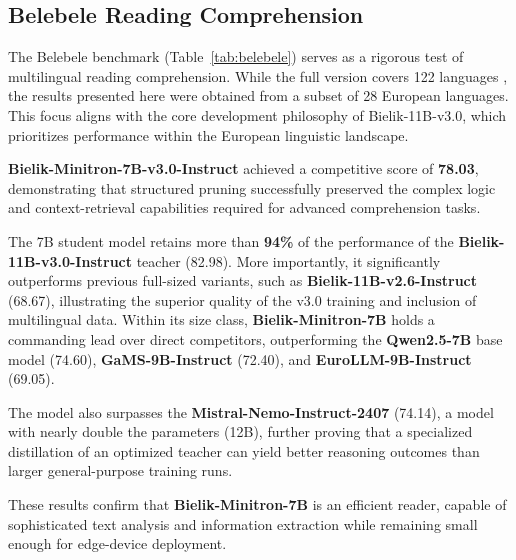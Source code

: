 \documentclass{article}
\begin{document}
\subsection{Belebele Reading Comprehension}
The Belebele benchmark (Table~\ref{tab:belebele}) serves as a rigorous test of multilingual reading comprehension. While the full version covers 122 languages \cite{Bandarkar_2024}, the results presented here were obtained from a subset of 28 European languages. This focus aligns with the core development philosophy of Bielik-11B-v3.0, which prioritizes performance within the European linguistic landscape.

\textbf{Bielik-Minitron-7B-v3.0-Instruct} achieved a competitive score of \textbf{78.03}, demonstrating that structured pruning successfully preserved the complex logic and context-retrieval capabilities required for advanced comprehension tasks.

The 7B student model retains more than \textbf{94\%} of the performance of the \textbf{Bielik-11B-v3.0-Instruct} teacher (82.98). More importantly, it significantly outperforms previous full-sized variants, such as \textbf{Bielik-11B-v2.6-Instruct} (68.67), illustrating the superior quality of the v3.0 training and inclusion of multilingual data. Within its size class, \textbf{Bielik-Minitron-7B} holds a commanding lead over direct competitors, outperforming the \textbf{Qwen2.5-7B} base model (74.60), \textbf{GaMS-9B-Instruct} (72.40), and \textbf{EuroLLM-9B-Instruct} (69.05).

The model also surpasses the \textbf{Mistral-Nemo-Instruct-2407} (74.14), a model with nearly double the parameters (12B), further proving that a specialized distillation of an optimized teacher can yield better reasoning outcomes than larger general-purpose training runs.

These results confirm that \textbf{Bielik-Minitron-7B} is an efficient reader, capable of sophisticated text analysis and information extraction while remaining small enough for edge-device deployment.
\end{document}
